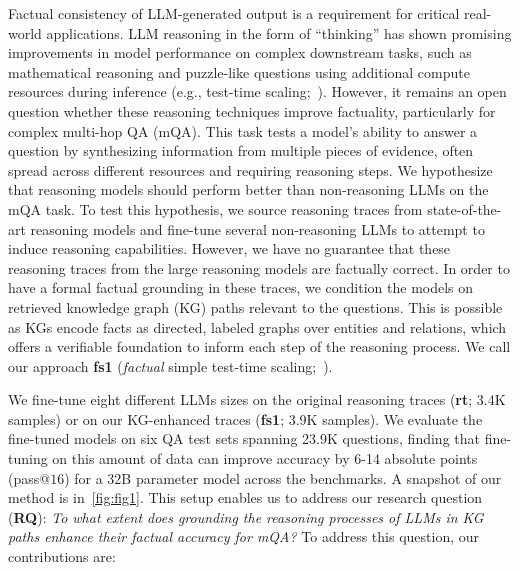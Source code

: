 \documentclass[11pt]{article}
\newcommand{\dataset}{\textbf{fs1}}
\begin{document}
Factual consistency of LLM-generated output is a requirement for critical real-world applications.
LLM reasoning in the form of ``thinking'' has shown promising improvements in model performance on complex downstream tasks, such as mathematical reasoning and puzzle-like questions using additional compute resources during inference (e.g., test-time scaling;~\citealp{wu2024inference,muennighoff2025s1simpletesttimescaling,zhang2025whathowwherewell}). 
However, it remains an open question whether these reasoning techniques improve factuality, particularly for complex multi-hop QA (mQA).
This task tests a model's ability to answer a question by synthesizing information from multiple pieces of evidence, often spread across different resources and requiring reasoning steps. 
We hypothesize that reasoning models should perform better than non-reasoning LLMs on the mQA task.
To test this hypothesis, we source reasoning traces from state-of-the-art reasoning models and fine-tune several non-reasoning LLMs to attempt to induce reasoning capabilities.
However, we have no guarantee that these reasoning traces from the large reasoning models are factually correct.
In order to have a formal factual grounding in these traces, we condition the models on retrieved knowledge graph (KG) paths relevant to the questions. 
This is possible as KGs encode facts as directed, labeled graphs over entities and relations, which offers a verifiable foundation to inform each step of the reasoning process.
We call our approach \dataset{} (\emph{factual} simple test-time scaling;~\citealp{muennighoff2025s1simpletesttimescaling}).

We fine-tune eight different LLMs sizes on the original reasoning traces (\textbf{rt}; 3.4K samples) or on our KG-enhanced traces (\dataset{}; 3.9K samples). 
We evaluate the fine-tuned models on six QA test sets spanning 23.9K questions, finding that fine-tuning on this amount of data can improve accuracy by 6-14 absolute points (pass@$16$) for a 32B parameter model across the benchmarks.
A snapshot of our method is in~\cref{fig:fig1}. 
This setup enables us to address our research question (\textbf{RQ}): \emph{To what extent does grounding the reasoning processes of LLMs in KG paths enhance their factual accuracy for mQA?} To address this question, our contributions are:
\end{document}
